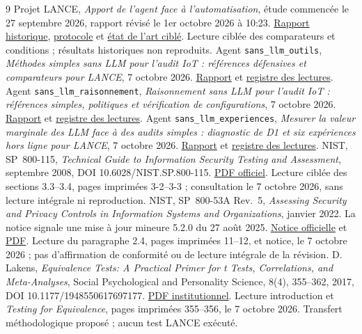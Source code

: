 \documentclass[11pt,a4paper]{article}
\newcommand{\code}[1]{\nolinkurl{#1}}
\begin{document}
{}
\begin{thebibliography}{9}\small
{} Projet LANCE, \emph{Apport de l'agent face à l'automatisation},
étude commencée le 27 septembre 2026, rapport révisé le 1er octobre 2026 à 10:23.
\href{report.pdf}{Rapport historique}, \href{protocol.md}{protocole} et
\href{state-of-the-art.md}{état de l'art ciblé}. Lecture ciblée des comparateurs
et conditions ; résultats historiques non reproduits.
 Agent \code{sans_llm_outils}, \emph{Méthodes simples sans LLM
pour l'audit IoT : références défensives et comparateurs pour LANCE},
7 octobre 2026. \href{sans-llm-outils.pdf}{Rapport} et
\href{sans-llm-outils-sources.json}{registre des lectures}.
 Agent \code{sans_llm_raisonnement}, \emph{Raisonnement
sans LLM pour l'audit IoT : références simples, politiques et vérification de
configurations}, 7 octobre 2026. \href{sans-llm-raisonnement.pdf}{Rapport} et
\href{sans-llm-raisonnement-sources.json}{registre des lectures}.
 Agent \code{sans_llm_experiences}, \emph{Mesurer la valeur
marginale des LLM face à des audits simples : diagnostic de D1 et six expériences
hors ligne pour LANCE}, 7 octobre 2026. \href{sans-llm-experiences.pdf}{Rapport}
et \href{sans-llm-experiences-sources.json}{registre des lectures}.
 NIST, SP~800-115, \emph{Technical Guide to Information Security
Testing and Assessment}, septembre 2008, DOI 10.6028/NIST.SP.800-115.
\href{https://nvlpubs.nist.gov/nistpubs/Legacy/SP/nistspecialpublication800-115.pdf}{PDF officiel}.
Lecture ciblée des sections 3.3--3.4, pages imprimées 3-2--3-3 ; consultation
le 7 octobre 2026, sans lecture intégrale ni reproduction.
 NIST, SP~800-53A Rev.~5, \emph{Assessing Security and Privacy
Controls in Information Systems and Organizations}, janvier 2022. La notice
signale une mise à jour mineure 5.2.0 du 27 août 2025.
\href{https://csrc.nist.gov/pubs/sp/800/53/a/r5/final}{Notice officielle} et
\href{https://nvlpubs.nist.gov/nistpubs/SpecialPublications/NIST.SP.800-53Ar5.pdf}{PDF}.
Lecture du paragraphe 2.4, pages imprimées 11--12, et notice, le 7 octobre 2026 ;
pas d'affirmation de conformité ou de lecture intégrale de la révision.
 D. Lakens, \emph{Equivalence Tests: A Practical Primer for
t Tests, Correlations, and Meta-Analyses}, Social Psychological and Personality
Science, 8(4), 355--362, 2017, DOI 10.1177/1948550617697177.
\href{https://pure.tue.nl/ws/portalfiles/portal/80918653/lakeequi2017.pdf}{PDF institutionnel}.
Lecture introduction et \emph{Testing for Equivalence}, pages imprimées 355--356,
le 7 octobre 2026. Transfert méthodologique proposé ; aucun test LANCE exécuté.
\end{thebibliography}
\end{document}
